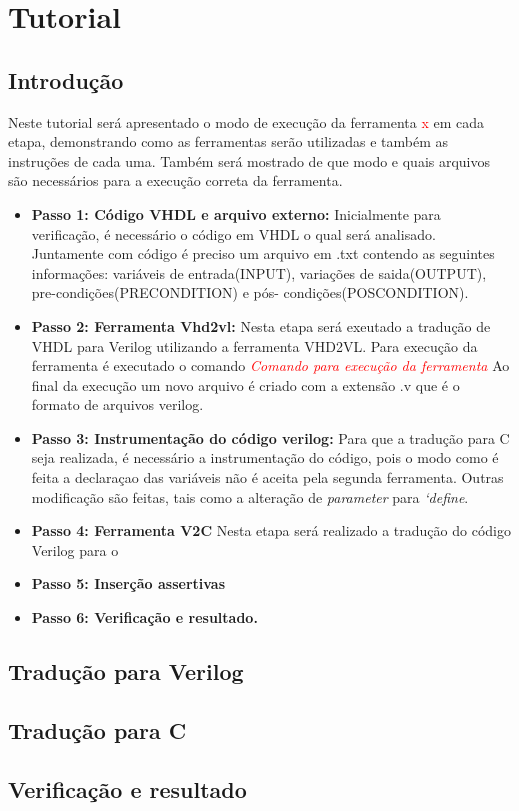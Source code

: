 \section{Tutorial}
\subsection{Introdução}
Neste tutorial será apresentado o modo de execução da ferramenta \textcolor{red}{x} em cada etapa, demonstrando como as ferramentas serão utilizadas e também as instruções de cada uma. Também será mostrado de que modo e quais arquivos são necessários para a execução correta da ferramenta.

\begin{itemize}
    \item \textbf{Passo 1: Código VHDL e arquivo externo:} Inicialmente para verificação, é necessário o código em VHDL o qual será analisado. Juntamente com código é preciso um arquivo em .txt contendo as seguintes informações: variáveis de entrada(INPUT), variações de saida(OUTPUT), pre-condições(PRECONDITION) e pós- condições(POSCONDITION).
    \item \textbf{Passo 2: Ferramenta Vhd2vl:} Nesta etapa será exeutado a tradução de VHDL para Verilog utilizando a ferramenta VHD2VL. Para execução da ferramenta é executado o comando \textit{\textcolor{red}{Comando para execução da ferramenta}} Ao final da execução um novo arquivo é criado com a extensão .v que é o formato de arquivos verilog.
    \item \textbf{Passo 3: Instrumentação do código verilog:} Para que a tradução para C seja realizada, é necessário a instrumentação do código, pois o modo como é feita a declaraçao das variáveis não é aceita pela segunda ferramenta. Outras modificação são feitas, tais como a alteração de \textit{parameter} para \textit{`define}.
    \item \textbf{Passo 4: Ferramenta V2C}
    Nesta etapa será realizado a tradução do código Verilog para o 
    \item \textbf{Passo 5: Inserção assertivas}
    \item \textbf{Passo 6: Verificação e resultado.}
\end{itemize}

\subsection{Tradução para Verilog}
\subsection{Tradução para C}
\subsection{Verificação e resultado}